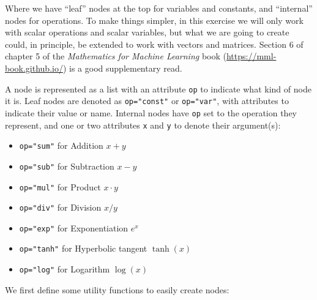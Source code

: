 \documentclass[
  a4paper,
]{article}
\providecommand{\tightlist}{%
  \setlength{\itemsep}{0pt}\setlength{\parskip}{0pt}}
\begin{document}
Where we have ``leaf'' nodes at the top for variables and constants, and
``internal'' nodes for operations. To make things simpler, in this
exercise we will only work with scalar operations and scalar variables,
but what we are going to create could, in principle, be extended to work
with vectors and matrices. Section 6 of chapter 5 of the
\emph{Mathematics for Machine Learning} book
(\url{https://mml-book.github.io/}) is a good supplementary read.

A node is represented as a list with an attribute \texttt{op} to
indicate what kind of node it is. Leaf nodes are denoted as
\texttt{op="const"} or \texttt{op="var"}, with attributes to indicate
their value or name. Internal nodes have \texttt{op} set to the
operation they represent, and one or two attributes \texttt{x} and
\texttt{y} to denote their argument(s):

\begin{itemize}
\tightlist
\item
  \texttt{op="sum"} for Addition \(x+y\)
\item
  \texttt{op="sub"} for Subtraction \(x-y\)
\item
  \texttt{op="mul"} for Product \(x\cdot y\)
\item
  \texttt{op="div"} for Division \(x / y\)
\item
  \texttt{op="exp"} for Exponentiation \(e^x\)
\item
  \texttt{op="tanh"} for Hyperbolic tangent \(\tanh(x)\)
\item
  \texttt{op="log"} for Logarithm \(\log(x)\)
\end{itemize}

We first define some utility functions to easily create nodes:
\end{document}
